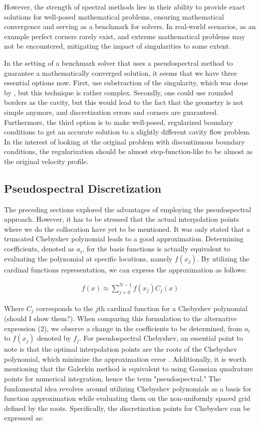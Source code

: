 However, the strength of spectral methods lies in their ability to provide
exact solutions for well-posed mathematical problems, ensuring mathematical
convergence and serving as a benchmark for solvers. In real-world scenarios, as
an example perfect corners rarely exist, and extreme mathematical problems may
not be encountered, mitigating the impact of singularities to some extent.

In the setting of a benchmark solver that uses a pseudospectral method to
guarantee a mathematically converged solution, it seems that we have three
essential options now. First, use substraction of the singularity, which was
done by \citep{botella1998}, but this technique is rather complex. Secondly,
one could use rounded borders as the cavity, but this would lead to the fact
that the geometry is not simple anymore, and discretization errors and corners
are guaranteed. Furthermore, the third option is to make well-posed,
regularized boundary conditions to get an accurate solution to a slightly
different cavity flow problem. In the interest of looking at the original
problem with discontinuous boundary conditions, the regularization should be
almost step-function-like to be almost as the original velocity profile.

\subsection{Pseudospectral Discretization}

The preceding sections explored the advantages of employing the pseudospectral
approach. However, it has to be stressed that the actual interpolation points
where we do the collocation have yet to be mentioned. It was only stated that a
truncated Chebyshev polynomial leads to a good approximation. Determining
coefficients, denoted as $a_i$, for the basis functions is actually equivalent
to evaluating the polynomial at specific locations, namely $f(x_j)$. By
utilizing the cardinal functions representation, we can express the
approximation as follows:

\begin{align}
f(x) \approx \sum^{N-1}_{j=0} f(x_j) C_j(x)
\end{align}

Where $C_j$ corresponds to the $j$th cardinal function for a Chebyshev
polynomial (should I show them?). When comparing this formulation to the
alternative expression (2), we observe a change in the coefficients to be
determined, from $a_i$ to $f(x_j)$ denoted by $f_j$. For pseudospectral
Chebyshev, an essential point to note is that the optimal interpolation points
are the roots of the Chebyshev polynomial, which minimize the approximation
error \cite{boyd2001}. Additionally, it is worth mentioning that the Galerkin
method is equivalent to using Gaussian quadrature points for numerical
integration, hence the term "pseudospectral." The fundamental idea revolves
around utilizing Chebyshev polynomials as a basis for function approximation
while evaluating them on the non-uniformly spaced grid defined by the roots.
Specifically, the discretization points for Chebyshev can be expressed as:

